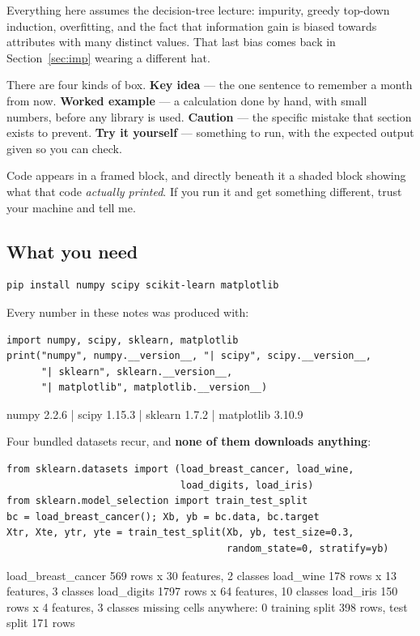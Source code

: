 \documentclass[11pt]{article}
\begin{document}
Everything here assumes the decision-tree lecture: impurity, greedy top-down
induction, overfitting, and the fact that information gain is biased towards
attributes with many distinct values. That last bias comes back in
Section~\ref{sec:imp} wearing a different hat.

There are four kinds of box. \textbf{Key idea} --- the one sentence to
remember a month from now. \textbf{Worked example} --- a calculation done by
hand, with small numbers, before any library is used. \textbf{Caution} --- the
specific mistake that section exists to prevent. \textbf{Try it yourself} ---
something to run, with the expected output given so you can check.

Code appears in a framed block, and directly beneath it a shaded block showing
what that code \emph{actually printed}. If you run it and get something
different, trust your machine and tell me.

\subsection{What you need}

\begin{lstlisting}
pip install numpy scipy scikit-learn matplotlib
\end{lstlisting}

Every number in these notes was produced with:

\begin{lstlisting}
import numpy, scipy, sklearn, matplotlib
print("numpy", numpy.__version__, "| scipy", scipy.__version__,
      "| sklearn", sklearn.__version__,
      "| matplotlib", matplotlib.__version__)
\end{lstlisting}
\begin{codeout}
numpy 2.2.6 | scipy 1.15.3 | sklearn 1.7.2 | matplotlib 3.10.9
\end{codeout}

Four bundled datasets recur, and \textbf{none of them downloads anything}:

\begin{lstlisting}
from sklearn.datasets import (load_breast_cancer, load_wine,
                              load_digits, load_iris)
from sklearn.model_selection import train_test_split
bc = load_breast_cancer(); Xb, yb = bc.data, bc.target
Xtr, Xte, ytr, yte = train_test_split(Xb, yb, test_size=0.3,
                                      random_state=0, stratify=yb)
\end{lstlisting}
\begin{codeout}
load_breast_cancer 569 rows x 30 features, 2 classes
load_wine          178 rows x 13 features, 3 classes
load_digits        1797 rows x 64 features, 10 classes
load_iris          150 rows x 4 features, 3 classes
missing cells anywhere: 0
training split 398 rows, test split 171 rows
\end{codeout}
\end{document}
